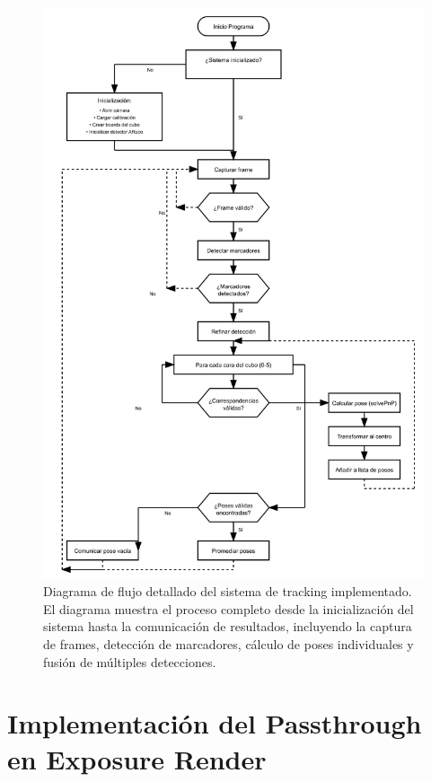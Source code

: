 \begin{figure}[h!]
	\centering
	\includegraphics[width=1.0\textwidth]{imaxes/flujo_tfg_correcto.png}
	\caption{Diagrama de flujo detallado del sistema de tracking implementado. El diagrama muestra el proceso completo desde la inicialización del sistema hasta la comunicación de resultados, incluyendo la captura de frames, detección de marcadores, cálculo de poses individuales y fusión de múltiples detecciones.}
	\label{fig:flujo_tfg_detallado}
\end{figure}

\section{Implementación del Passthrough en Exposure Render}
